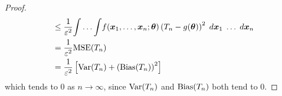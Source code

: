 \begin{proof}
\begin{align*}
         & \leq \frac{1}{\varepsilon^2} {\int \ldots \int} f(\bm{x}_1 , \ldots , \bm{x}_n ; \bm{\theta}) \left( T_n - g (\bm{\theta}) \right)^2 \; d \bm{x}_1 \; \ldots \; d \bm{x}_n                                                       \\
         & = \frac{1}{\varepsilon^2} {\operatorname{MSE}} (T_n)                                                                                                                                                                                          \\
         & = \frac{1}{\varepsilon^2} \left[ {\operatorname{Var}} (T_n) + \left( {\operatorname{Bias}} (T_n) \right)^2 \right]
    \end{align*}
    which tends to $0$ as $n \to \infty$, since ${\operatorname{Var}} (T_n)$ and ${\operatorname{Bias}} (T_n)$ both tend to $0$.
\end{proof}

